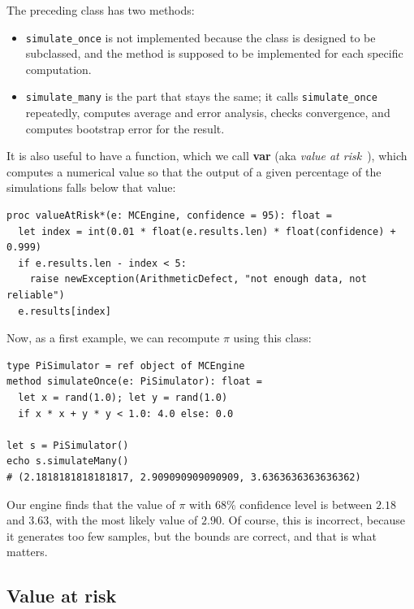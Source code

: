 \documentclass[justified, sixbynine]{tufte-book}
\def\ft{\small\tt}
\theoremstyle{plain}%
\newtheorem * {corollary}{Corollary}
\theoremstyle{definition}
\theoremstyle{remark}
\newtheorem * {remark}{Remark}
\newtheorem * {note}{Note}
\begin{document}
\begin{fullwidth}
The preceding class has two methods:
\begin{itemize}
\item {\ft simulate\_once} is not implemented because the class is designed to be subclassed, and the method is supposed to be implemented for each specific computation.
\item {\ft simulate\_many} is the part that stays the same; it calls {\ft simulate\_once} repeatedly, computes average and error analysis, checks convergence, and computes bootstrap error for the result.
\end{itemize}

It is also useful to have a function, which we call {\bf var} (aka {\it value at risk}~\cite{wilmott}), which computes a numerical value so that the output of a given percentage of the simulations falls below that value:

\begin{lstlisting}[caption={in file: {\ft nlib.nim}}]
proc valueAtRisk*(e: MCEngine, confidence = 95): float =
  let index = int(0.01 * float(e.results.len) * float(confidence) + 0.999)
  if e.results.len - index < 5:
    raise newException(ArithmeticDefect, "not enough data, not reliable")
  e.results[index]
\end{lstlisting}

Now, as a first example, we can recompute $\pi$ using this class:


\begin{lstlisting}
type PiSimulator = ref object of MCEngine
method simulateOnce(e: PiSimulator): float =
  let x = rand(1.0); let y = rand(1.0)
  if x * x + y * y < 1.0: 4.0 else: 0.0

let s = PiSimulator()
echo s.simulateMany()
# (2.1818181818181817, 2.909090909090909, 3.6363636363636362)
\end{lstlisting}

Our engine finds that the value of $\pi$ with 68\% confidence level is between $2.18$ and $3.63$, with the most likely value of $2.90$. Of course, this is incorrect, because it generates too few samples, but the bounds are correct, and that is what matters.

\subsection{Value at risk}


\end{fullwidth}
\end{document}
